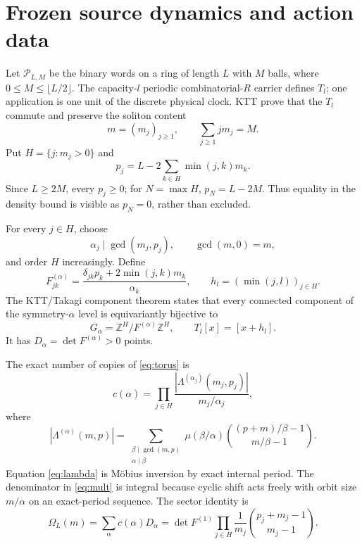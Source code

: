 \documentclass[10pt]{article}
\newif\ifroundzero
\begin{document}
\section{Frozen source dynamics and action data}
Let $\mathcal P_{L,M}$ be the binary words on a ring of length $L$ with $M$
balls, where $0\le M\le\lfloor L/2\rfloor$.  The capacity-$l$ periodic
combinatorial-$R$ carrier defines $T_l$; one application is one unit of the
discrete physical clock.  KTT prove that the $T_l$ commute and preserve the
soliton content~\cite{KTT}
\[
m=(m_j)_{j\ge1},\qquad \sum_{j\ge1}j m_j=M.
\]
Put $H=\{j:m_j>0\}$ and
\begin{equation}\label{eq:vacancy}
p_j=L-2\sum_{k\in H}\min(j,k)m_k .
\end{equation}
Since $L\ge2M$, every $p_j\ge0$; for $N=\max H$,
$p_N=L-2M$.  Thus equality in the density bound is visible as $p_N=0$,
rather than excluded.

For every $j\in H$, choose
\[
\alpha_j\mid\gcd(m_j,p_j),\qquad \gcd(m,0)=m,
\]
and order $H$ increasingly.  Define
\begin{equation}\label{eq:Fh}
F^{(\alpha)}_{jk}
=\frac{\delta_{jk}p_k+2\min(j,k)m_k}{\alpha_k},
\qquad
h_l=(\min(j,l))_{j\in H}.
\end{equation}
The KTT/Takagi component theorem states that every connected component of
the symmetry-$\alpha$ level is equivariantly bijective to~\cite{Takagi}
\begin{equation}\label{eq:torus}
G_\alpha=\mathbb Z^H/F^{(\alpha)}\mathbb Z^H,
\qquad T_l[x]=[x+h_l].
\end{equation}
It has $D_\alpha=\det F^{(\alpha)}>0$ points.

\ifroundzero
The source theorem also supplies a positive integer component multiplicity
$c(\alpha)$, and the symmetry sectors sum to the KTT level cardinality.  The
later draft rounds make this multiplicity and the boundary cancellation
explicit.
\else
The exact number of copies of \eqref{eq:torus} is
\begin{equation}\label{eq:mult}
c(\alpha)=\prod_{j\in H}
\frac{|\Lambda^{(\alpha_j)}(m_j,p_j)|}{m_j/\alpha_j},
\end{equation}
where
\begin{equation}\label{eq:lambda}
|\Lambda^{(\alpha)}(m,p)|=
\sum_{\substack{\beta\mid\gcd(m,p)\\\alpha\mid\beta}}
\mu(\beta/\alpha)
\binom{(p+m)/\beta-1}{m/\beta-1}.
\end{equation}
Equation \eqref{eq:lambda} is M\"obius inversion by exact internal period.
The denominator in \eqref{eq:mult} is integral because cyclic shift acts
freely with orbit size $m/\alpha$ on an exact-period sequence.  The sector
identity is
\begin{equation}\label{eq:sector-sum}
\Omega_L(m)=\sum_\alpha c(\alpha)D_\alpha
=\det F^{(1)}\prod_{j\in H}\frac1{m_j}
\binom{p_j+m_j-1}{m_j-1}.
\end{equation}
\fi
\end{document}

